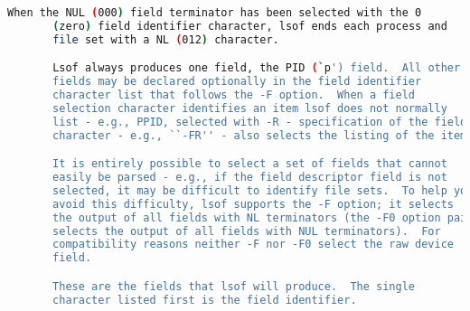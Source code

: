 {{\begin{lstlisting}[language=bash]
       When the NUL (000) field terminator has been selected with the 0
       (zero) field identifier character, lsof ends each process and
       file set with a NL (012) character.

       Lsof always produces one field, the PID (`p') field.  All other
       fields may be declared optionally in the field identifier
       character list that follows the -F option.  When a field
       selection character identifies an item lsof does not normally
       list - e.g., PPID, selected with -R - specification of the field
       character - e.g., ``-FR'' - also selects the listing of the item.

       It is entirely possible to select a set of fields that cannot
       easily be parsed - e.g., if the field descriptor field is not
       selected, it may be difficult to identify file sets.  To help you
       avoid this difficulty, lsof supports the -F option; it selects
       the output of all fields with NL terminators (the -F0 option pair
       selects the output of all fields with NUL terminators).  For
       compatibility reasons neither -F nor -F0 select the raw device
       field.

       These are the fields that lsof will produce.  The single
       character listed first is the field identifier.


\end{lstlisting}}}
